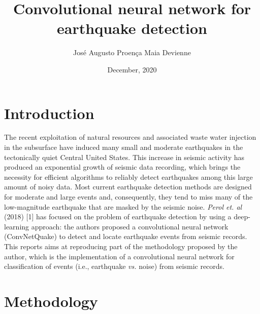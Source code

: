 \documentclass{article}
\title{Convolutional neural network for earthquake detection}
\author{José Augusto Proença Maia Devienne}
\affil{Big Data to Earth Scientists}
\date{December, 2020}
\begin{document}
\maketitle

\section{Introduction}

The recent exploitation of natural resources and associated waste water injection in the subsurface have induced many small and moderate earthquakes in the tectonically quiet Central United States. This increase in seismic activity has produced an exponential growth of seismic data recording, which brings the necessity for efficient algorithms to reliably detect earthquakes among this large amount of noisy data. Most current earthquake detection methods are designed for moderate and large events and, consequently, they tend to miss many of the low-magnitude earthquake that are masked by the seismic noise. \textit{Perol et. al} (2018) [1] has focused on the problem of earthquake detection by using a deep-learning approach: the authors proposed a convolutional neural network (ConvNetQuake) to detect and locate earthquake events from seismic records. This reports aims at reproducing part of the methodology  proposed by the author, which is the implementation of a convolutional neural network for classification of events (i.e., earthquake \textit{vs.} noise) from seismic records. 




\section{Methodology}
\end{document}
